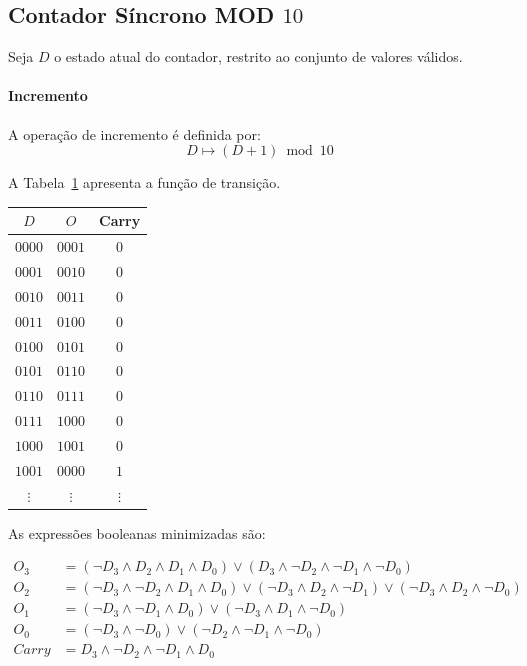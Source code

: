 \subsection{Contador Síncrono MOD $10$}

Seja $D$ o estado atual do contador, restrito ao conjunto de valores válidos.

\paragraph{Incremento}
A operação de incremento é definida por:
\[
D \mapsto (D + 1) \bmod 10
\]

A Tabela~\ref{tab:inc_mod10} apresenta a função de transição.

\begin{table} [H] \label{tab:inc_mod10}
\begin{center}
\begin{tabular}{c|cc}
    $D$ & $O$ & Carry \\
    \hline
    $0000$ & $0001$ & $0$ \\
    $0001$ & $0010$ & $0$ \\
    $0010$ & $0011$ & $0$ \\
    $0011$ & $0100$ & $0$ \\
    $0100$ & $0101$ & $0$ \\
    $0101$ & $0110$ & $0$ \\
    $0110$ & $0111$ & $0$ \\
    $0111$ & $1000$ & $0$ \\
    $1000$ & $1001$ & $0$ \\
    $1001$ & $0000$ & $1$ \\
    $\vdots$ & $\vdots$ & $\vdots$ \\
\end{tabular}
\end{center}
\end{table}

As expressões booleanas minimizadas são:

\begin{align*}
    O_3 &= (\lnot D_3 \land D_2 \land D_1 \land D_0) \lor (D_3 \land \lnot D_2 \land \lnot D_1 \land \lnot D_0) \\[4pt]
    O_2 &= (\lnot D_3 \land \lnot D_2 \land D_1 \land D_0) \lor (\lnot D_3 \land D_2 \land \lnot D_1) \lor (\lnot D_3 \land D_2 \land \lnot D_0) \\[4pt]
    O_1 &= (\lnot D_3 \land \lnot D_1 \land D_0) \lor (\lnot D_3 \land D_1 \land \lnot D_0) \\[4pt]
    O_0 &= (\lnot D_3 \land \lnot D_0) \lor (\lnot D_2 \land \lnot D_1 \land \lnot D_0) \\[4pt]
    Carry &= D_3 \land \lnot D_2 \land \lnot D_1 \land D_0
\end{align*}

